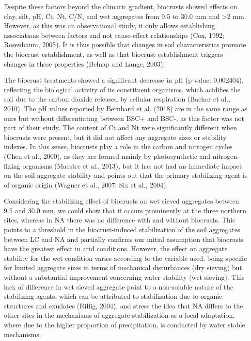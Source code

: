 {Despite these factors beyond the climatic gradient, biocrusts showed effects on clay, silt, pH, Ct, Nt, C/N, and wet aggregates from 9.5 to 30.0 mm and >2 mm. However, as this was an observational study, it only allows establishing associations between factors and not cause-effect relationships (Cox, 1992; Rosenbaum, 2005). It is thus possible that changes in soil characteristics promote the biocrust establishment, as well as that biocrust establishment triggers changes in these properties (Belnap and Lange, 2003).

The biocrust treatments showed a significant decrease in pH (p-value: 0.002404), reflecting the biological activity of its constituent organisms, which acidifies the soil due to the carbon dioxide released by cellular respiration (Bachar et al., 2010). The pH values reported by Bernhard et al. (2018) are in the same range as ours but without differentiating between BSC+ and BSC-, as this factor was not part of their study. The content of Ct and Nt were significantly different when biocrusts were present, but it did not affect any aggregate sizes or stability indexes. In this sense, biocrusts play a role in the carbon and nitrogen cycles (Chen et al., 2000), as they are formed mainly by photosynthetic and nitrogen-fixing organisms (Maestre et al., 2013), but it has not had an immediate impact on the soil aggregate stability and points out that the primary stabilizing agent is of organic origin (Wagner et al., 2007; Six et al., 2004).

Considering the stabilizing effect of biocrusts on wet sieved aggregates between 9.5 and 30.0 mm, we could show that it occurs prominently at the three northern sites, whereas in NA there was no difference with and without biocrusts. This points to a threshold in the biocrust-induced stabilization of the soil aggregates between LC and NA and partially confirms our initial assumption that biocrusts have the greatest effect in arid conditions. However, the effect on aggregate stability for the wet condition varies according to the variable used, being specific for limited aggregate sizes in terms of mechanical disturbances (dry sieving) but without a substantial improvement concerning water stability (wet sieving). This lack of difference in wet sieved aggregate point to a non-soluble nature of the stabilizing agents, which can be attributed to stabilization due to organic structures and exudates (Rillig, 2004), and stress the idea that NA differs to the other sites in the mechanisms of aggregate stabilization as a local adaptation, where due to the higher proportion of precipitation, is conducted by water stable mechanisms.

}
